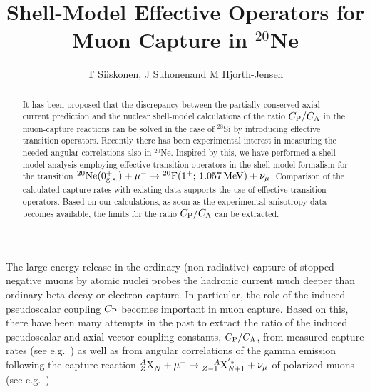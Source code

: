 \documentclass[12pt]{iopart}
\begin{document}
\title{Shell-Model Effective Operators for Muon Capture in $^{20}$Ne}

\author{T Siiskonen\dag, J Suhonen\dag and M Hjorth-Jensen\ddag}

\address{\dag Department of Physics, University of Jyv\"askyl\"a, FIN-40351
Jyv\"askyl\"a, Finland}

\address{\ddag Department of Physics, University of Oslo, N-0316 Oslo, Norway}

\begin{abstract}
It has been proposed that
the discrepancy between the partially-conserved axial-current prediction
and the nuclear shell-model calculations of the ratio $C_{\rm P}/C_{\rm A}$
in the muon-capture reactions can be solved in the case of $^{28}$Si by
introducing effective transition operators. Recently there has been
experimental interest in measuring the needed angular correlations also in
$^{20}$Ne. Inspired by this, we have performed a shell-model analysis employing
effective transition operators in the shell-model formalism
for the transition $^{20}{\rm Ne}(0^+_{\rm g.s.})+\mu^-
\to {}^{20}{\rm F}(1^+;\, 1.057\, {\rm MeV})+\nu_\mu$. Comparison of the
calculated capture rates with existing data supports the
use of effective transition operators. Based on our calculations, as soon as
the experimental
anisotropy data becomes available, the limits for the ratio $C_{\rm P}/
C_{\rm A}$ can be extracted.
\end{abstract}



\submitted

\maketitle

The large energy release in the ordinary (non-radiative) capture of stopped
negative muons by atomic nuclei probes the hadronic current much deeper than
ordinary beta decay or electron capture. In particular, the role
of the induced pseudoscalar coupling $C_{\rm P}$ becomes important in muon
capture. 
Based on this, there have been many attempts in the past to extract the ratio
of the induced pseudoscalar
and axial-vector coupling constants, $C_{\rm P}/C_{\rm A}$, from measured
capture rates (see e.g.\ \cite{mor60,cie76,gmi90,kuz94,joh96,sii98}) as well as
from angular correlations of the gamma emission
following the capture reaction ${}^A_Z{\rm X}^{}_N+\mu^-\to{}^{\phantom{AA}A}
_{Z-1}{\rm X}_{N+1}^{'*}+\nu_\mu$ of polarized muons (see e.g.\
\cite{mof97,bru95,sii99}).
\end{document}
